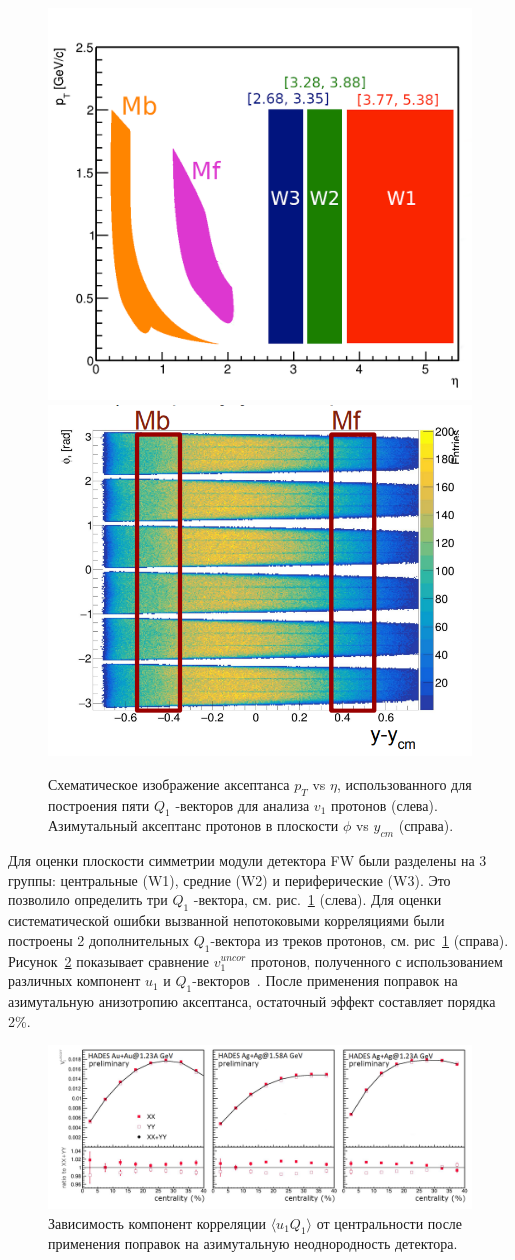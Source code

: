 \begin{figure}[h]
\begin{center}
  \includegraphics[width=0.37\linewidth]{images/eta_pt_qvectors.png}
   \includegraphics[width=0.39\linewidth]{images/hades_phi_rapidity.png}
   \caption{ Схематическое изображение аксептанса $p_T$ vs $\eta$, использованного для построения пяти  $Q_1$ -векторов для анализа $v_1$ протонов (слева).
   Азимутальный аксептанс  протонов в плоскости $\phi$  vs $y_{cm}$ (справа). }
\label{fig:hades_qvectors}
\end{center}
\end{figure}
%
Для оценки плоскости симметрии модули детектора FW были разделены на 3 группы: центральные (W1), средние (W2) и периферические (W3). 
Это позволило определить три $Q_1$ -вектора, см. рис.~\ref{fig:hades_qvectors} (слева).
Для оценки систематической ошибки вызванной непотоковыми корреляциями были построены 2 дополнительных $Q_1$-вектора из треков протонов, см. рис~\ref{fig:hades_qvectors} (справа).
Рисунок~\ref{fig:hades_uq_corr} показывает сравнение $v_1^{uncor}$ протонов, полученного с использованием различных компонент $u_1$ и $Q_1$-векторов~\cite{Mamaev:2020qom}. 
После применения поправок на азимутальную анизотропию аксептанса, остаточный эффект составляет порядка 2\%.\\
%
\begin{figure}[h]
\begin{center}
\includegraphics[width=0.75\linewidth]{images/hades_u1W1_centrality.png}
\caption{Зависимость компонент корреляции $\langle u_1 Q_1 \rangle$ от центральности после применения поправок на азимутальную неоднородность детектора.}
\label{fig:hades_uq_corr}
\end{center}
\end{figure}

